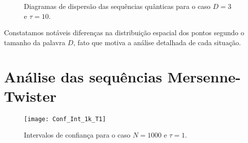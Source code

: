 \begin{figure}
	\centering
	\caption{Diagramas de dispersão das sequências quânticas para o caso $D=3$ e $\tau=10$.}\label{Fig:QuantD3tau10}
\end{figure}


Constatamos notáveis diferenças na distribuição espacial dos pontos segundo o tamanho da palavra $D$, fato que motiva a análise detalhada de cada situação.

\section{Análise das sequências Mersenne-Twister}

\begin{figure}
	\centering
	\texttt{[image: Conf\_Int\_1k\_T1]}
	\caption{Intervalos de confiança para o caso $N=1000$ e $\tau=1$.}\label{Fig:Conf_Int_1k_T1}
\end{figure}


